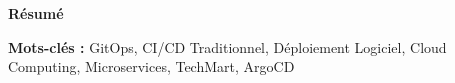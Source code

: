 \thispagestyle{empty}

\begin{center}
{\Large \textbf{Résumé}}
\end{center}

\vspace{1cm}


\textbf{Mots-clés :} GitOps, CI/CD Traditionnel, Déploiement Logiciel, Cloud Computing, Microservices, TechMart, ArgoCD

\newpage

\newpage

\newpage